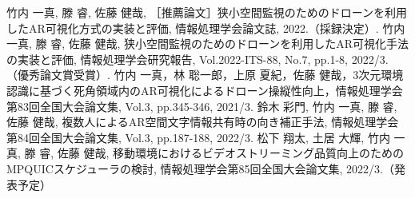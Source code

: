 \documentclass[a4paper,11pt]{ujreport}
\begin{document}





\clearpage

\renewcommand{\bibname}{研究業績}


\begin{thebibliography}{99}
  \bibitem{} 竹内 一真, 滕 睿, 佐藤 健哉, ［推薦論文］狭小空間監視のためのドローンを利用したAR可視化方式の実装と評価, 情報処理学会論文誌, 2022.（採録決定）.
  \bibitem{} 竹内 一真, 滕 睿, 佐藤 健哉, 狭小空間監視のためのドローンを利用したAR可視化手法の実装と評価, 情報処理学会研究報告, Vol.2022-ITS-88, No.7, pp.1-8, 2022/3.（優秀論文賞受賞）.
  \bibitem{} 竹内 一真，林 聡一郎，上原 夏紀，佐藤 健哉，3次元環境認識に基づく死角領域内のAR可視化によるドローン操縦性向上，情報処理学会第83回全国大会論文集, Vol.3, pp.345-346, 2021/3.
  \bibitem{} 鈴木 彩門, 竹内 一真, 滕 睿, 佐藤 健哉, 複数人によるAR空間文字情報共有時の向き補正手法, 情報処理学会第84回全国大会論文集, Vol.3, pp.187-188, 2022/3.
  \bibitem{} 松下 翔太, 土居 大輝, 竹内 一真, 滕 睿, 佐藤 健哉, 移動環境におけるビデオストリーミング品質向上のためのMPQUICスケジューラの検討, 情報処理学会第85回全国大会論文集, 2022/3.（発表予定）
\end{thebibliography}

\clearpage

\end{document}

